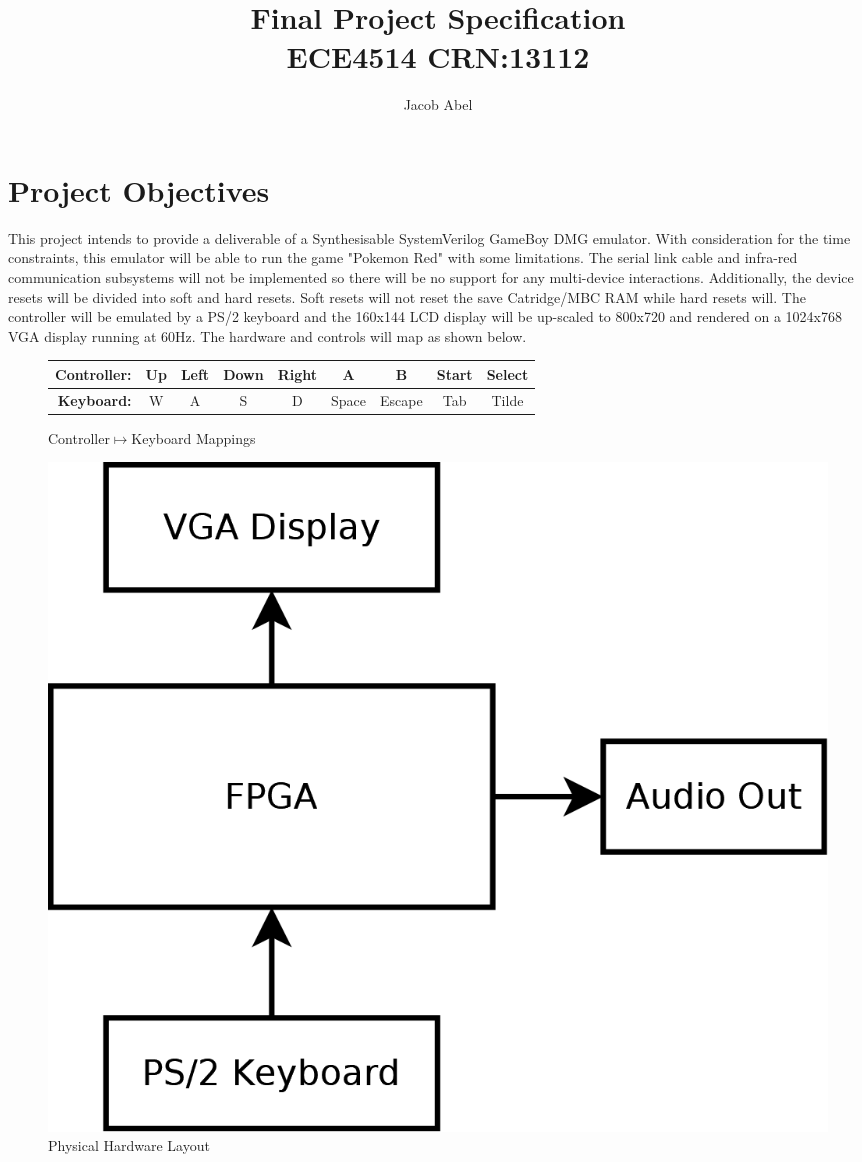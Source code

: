 \documentclass[12pt,letterpaper,titlepage, final]{report}
\author{Jacob Abel}
\title{	Final Project Specification
	\\\large ECE4514 CRN:13112
}
\begin{document}
\maketitle
\begin{raggedright}
\hypertarget{projobj}{\section{Project Objectives}}

This project intends to provide a deliverable of a Synthesisable SystemVerilog GameBoy DMG emulator. With consideration for the time constraints, this emulator will be able to run the game "Pokemon Red" with some limitations. The serial link cable and infra-red communication subsystems will not be implemented so there will be no support for any multi-device interactions. Additionally, the device resets will be divided into soft and hard resets. Soft resets will not reset the save Catridge/MBC RAM while hard resets will. The controller will be emulated by a PS/2 keyboard and the 160x144 LCD display will be up-scaled to 800x720 and rendered on a 1024x768 VGA display running at 60Hz. The hardware and controls will map as shown below.
\vfill
\begin{figure}[ht]
\centering
\begin{tabular}{|r|c|c|c|c|c|c|c|c|}
\hline 
\textbf{Controller:} & Up & Left & Down & Right & A & B & Start & Select \\ 
\hline 
\textbf{Keyboard:} & W & A & S & D & Space & Escape & Tab & Tilde \\ 
\hline 
\end{tabular} 
\hypertarget{fig1}{\caption{Controller$\mapsto$Keyboard Mappings}}
\end{figure}
\vspace{2\baselineskip}
\begin{figure}[ht]
\centering
\includegraphics[width=\textwidth, height=20\baselineskip, keepaspectratio=true]{GB_Dia}
\hypertarget{fig2}{\caption{Physical Hardware Layout}}
\end{figure}



\end{raggedright}
\end{document}
